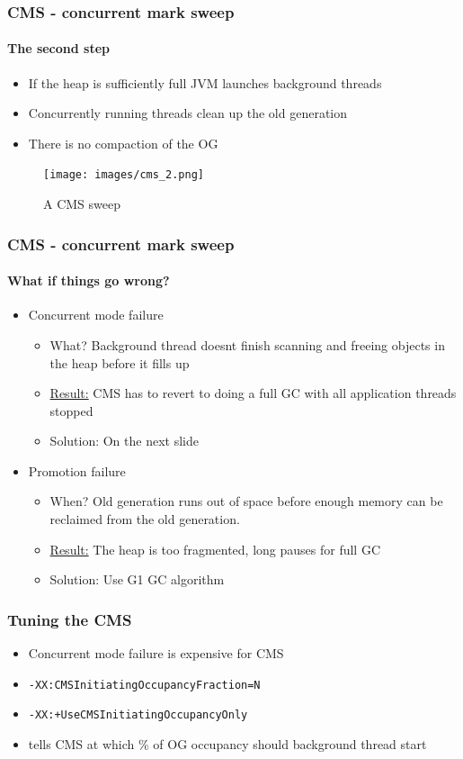 \documentclass{beamer}
\begin{document}
\begin{frame}
    \frametitle{CMS - concurrent mark sweep}
    \framesubtitle{The second step} 
    \begin{itemize}
        \item If the heap is sufficiently full JVM launches background threads
        \item Concurrently running threads clean up the old generation
        \item There is no compaction of the OG 
    \end{itemize}
    \begin{figure}
        \texttt{[image: images/cms\_2.png]}
        \caption{A CMS sweep}
    \end{figure}
\end{frame}
\begin{frame}
    \frametitle{CMS - concurrent mark sweep}
    \framesubtitle{What if things go wrong?} 
    \begin{itemize}
        \item Concurrent mode failure
        \begin{itemize}
            \item What? Background thread doesnt finish scanning and freeing objects in the heap before it fills up
            \item \underline{Result:} CMS has to revert to doing a full GC with all application threads stopped
            \item Solution: On the next slide
        \end{itemize}
        \item Promotion failure
        \begin{itemize}
            \item When? Old generation runs out of space before enough memory can be reclaimed from the old generation.
            \item  \underline{Result:} The heap is too fragmented, long pauses for full GC 
            \item Solution: Use G1 GC algorithm
        \end{itemize}
    \end{itemize}
\end{frame}

\begin{frame}
    \frametitle{Tuning the CMS}
    \begin{itemize}
        \item Concurrent mode failure is expensive for CMS
        \item \texttt{-XX:CMSInitiatingOccupancyFraction=N}
        \item \texttt{-XX:+UseCMSInitiatingOccupancyOnly}
        \item tells CMS at which \% of OG occupancy should background thread start
    \end{itemize}
\end{frame}
\end{document}
